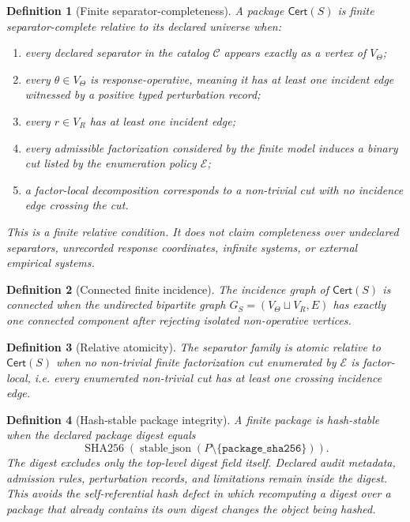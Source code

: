 \documentclass[11pt]{article}
\newtheorem{definition}{Definition}[section]
\newcommand{\VTheta}{V_{\Theta}}
\newcommand{\VR}{V_R}
\newcommand{\Cert}{\mathsf{Cert}}
\begin{document}
\begin{definition}[Finite separator-completeness]
A package $\Cert(S)$ is finite separator-complete relative to its declared universe when:
\begin{enumerate}[label=(\roman*)]
  \item every declared separator in the catalog $\mathcal C$ appears exactly as a vertex of $\VTheta$;
  \item every $\theta\in\VTheta$ is response-operative, meaning it has at least one incident edge witnessed by a positive typed perturbation record;
  \item every $r\in\VR$ has at least one incident edge;
  \item every admissible factorization considered by the finite model induces a binary cut listed by the enumeration policy $\mathcal E$;
  \item a factor-local decomposition corresponds to a non-trivial cut with no incidence edge crossing the cut.
\end{enumerate}
This is a finite relative condition. It does not claim completeness over undeclared separators, unrecorded response coordinates, infinite systems, or external empirical systems.
\end{definition}

\begin{definition}[Connected finite incidence]
The incidence graph of $\Cert(S)$ is connected when the undirected bipartite graph $G_S=(\VTheta\sqcup\VR,E)$ has exactly one connected component after rejecting isolated non-operative vertices.
\end{definition}

\begin{definition}[Relative atomicity]
The separator family is atomic relative to $\Cert(S)$ when no non-trivial finite factorization cut enumerated by $\mathcal E$ is factor-local, i.e. every enumerated non-trivial cut has at least one crossing incidence edge.
\end{definition}

\begin{definition}[Hash-stable package integrity]
A finite package is hash-stable when the declared package digest equals
\[
  \operatorname{SHA256}(\operatorname{stable\_json}(P\setminus\{\texttt{package\_sha256}\})).
\]
The digest excludes only the top-level digest field itself. Declared audit metadata, admission rules, perturbation records, and limitations remain inside the digest. This avoids the self-referential hash defect in which recomputing a digest over a package that already contains its own digest changes the object being hashed.
\end{definition}
\end{document}
